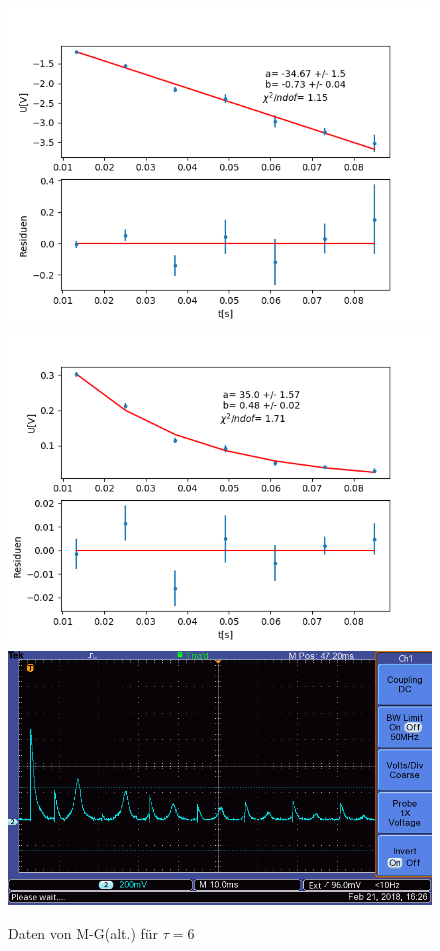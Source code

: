 \documentclass[12pt,a4paper]{article}
\begin{document}
\begin{figure}
\centering
\includegraphics[scale=0.5]{Bilder/T2Anhang/T2log6alt.png}
\includegraphics[scale=0.5]{Bilder/T2Anhang/T2exp6alt.png}
\includegraphics[scale=0.5]{Bilder/T2Anhang/T2plot6alt.png}
\caption{Daten von M-G(alt.) für $\tau = 6$}
\end{figure}
\end{document}
